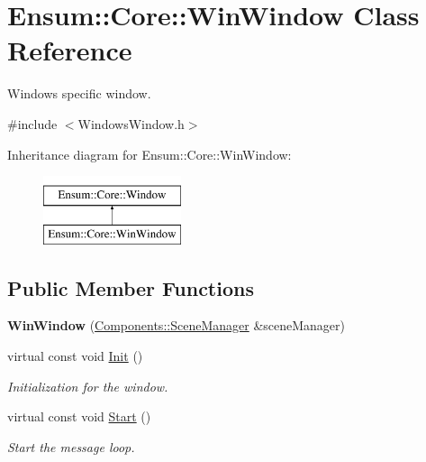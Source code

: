 \hypertarget{class_ensum_1_1_core_1_1_win_window}{}\section{Ensum\+:\+:Core\+:\+:Win\+Window Class Reference}
\label{class_ensum_1_1_core_1_1_win_window}


Windows specific window.  




{\ttfamily \#include $<$Windows\+Window.\+h$>$}

Inheritance diagram for Ensum\+:\+:Core\+:\+:Win\+Window\+:\begin{figure}[H]
\begin{center}
\leavevmode
\includegraphics[height=2.000000cm]{class_ensum_1_1_core_1_1_win_window}
\end{center}
\end{figure}
\subsection*{Public Member Functions}
\begin{DoxyCompactItemize}
\item 
{\bfseries Win\+Window} (\hyperlink{class_ensum_1_1_components_1_1_scene_manager}{Components\+::\+Scene\+Manager} \&scene\+Manager)\hypertarget{class_ensum_1_1_core_1_1_win_window_ab3a79f80f08b914e3bb5510633423028}{}\label{class_ensum_1_1_core_1_1_win_window_ab3a79f80f08b914e3bb5510633423028}

\item 
virtual const void \hyperlink{class_ensum_1_1_core_1_1_win_window_afb59ce364f98918b2b17653cbfc39ead}{Init} ()\hypertarget{class_ensum_1_1_core_1_1_win_window_afb59ce364f98918b2b17653cbfc39ead}{}\label{class_ensum_1_1_core_1_1_win_window_afb59ce364f98918b2b17653cbfc39ead}

\begin{DoxyCompactList}\small\item\em Initialization for the window. \end{DoxyCompactList}\item 
virtual const void \hyperlink{class_ensum_1_1_core_1_1_win_window_a1c316902d186c3d685210237e3438745}{Start} ()\hypertarget{class_ensum_1_1_core_1_1_win_window_a1c316902d186c3d685210237e3438745}{}\label{class_ensum_1_1_core_1_1_win_window_a1c316902d186c3d685210237e3438745}

\begin{DoxyCompactList}\small\item\em Start the message loop. \end{DoxyCompactList}\end{DoxyCompactItemize}
